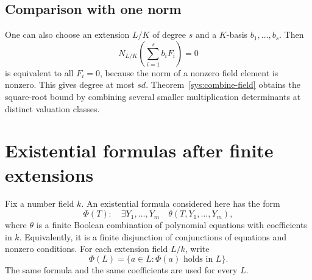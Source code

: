 \documentclass[11pt,a4paper]{article}
\theoremstyle{definition}
\begin{document}
\subsection*{Comparison with one norm}

One can also choose an extension $L/K$ of degree $s$ and a
$K$-basis $b_1,\ldots,b_s$. Then
\[
              N_{L/K}\left(\sum_{i=1}^s b_iF_i\right)=0
\]
is equivalent to all $F_i=0$, because the norm of a nonzero
field element is nonzero. This gives degree at most $sd$.
Theorem~\ref{sys:combine-field} obtains the square-root bound by
combining several smaller multiplication determinants at
distinct valuation classes.

\section{Existential formulas after finite extensions}

Fix a number field $k$. An existential formula considered here
has the form
\[
 \Phi(T):\quad \exists Y_1,\ldots,Y_m\quad
             \theta(T,Y_1,\ldots,Y_m),
\]
where $\theta$ is a finite Boolean combination of polynomial
equations with coefficients in $k$. Equivalently, it is a finite
disjunction of conjunctions of equations and nonzero conditions.
For each extension field $L/k$, write
\[
                \Phi(L)=\{a\in L:\Phi(a)\text{ holds in }L\}.
\]
The same formula and the same coefficients are used for every $L$.
\end{document}
